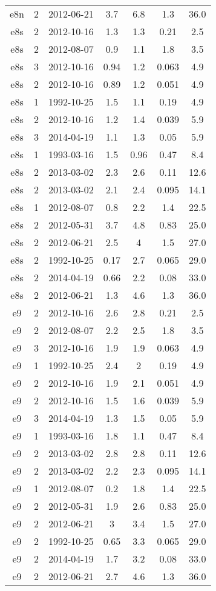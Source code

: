 \begin{table*}[htp]
\begin{tabular}{ccccccc}
e8n & 2 & 2012-06-21 & 3.7 & 6.8 & 1.3 & 36.0 \\
e8s & 2 & 2012-10-16 & 1.3 & 1.3 & 0.21 & 2.5 \\
e8s & 2 & 2012-08-07 & 0.9 & 1.1 & 1.8 & 3.5 \\
e8s & 3 & 2012-10-16 & 0.94 & 1.2 & 0.063 & 4.9 \\
e8s & 2 & 2012-10-16 & 0.89 & 1.2 & 0.051 & 4.9 \\
e8s & 1 & 1992-10-25 & 1.5 & 1.1 & 0.19 & 4.9 \\
e8s & 2 & 2012-10-16 & 1.2 & 1.4 & 0.039 & 5.9 \\
e8s & 3 & 2014-04-19 & 1.1 & 1.3 & 0.05 & 5.9 \\
e8s & 1 & 1993-03-16 & 1.5 & 0.96 & 0.47 & 8.4 \\
e8s & 2 & 2013-03-02 & 2.3 & 2.6 & 0.11 & 12.6 \\
e8s & 2 & 2013-03-02 & 2.1 & 2.4 & 0.095 & 14.1 \\
e8s & 1 & 2012-08-07 & 0.8 & 2.2 & 1.4 & 22.5 \\
e8s & 2 & 2012-05-31 & 3.7 & 4.8 & 0.83 & 25.0 \\
e8s & 2 & 2012-06-21 & 2.5 & 4 & 1.5 & 27.0 \\
e8s & 2 & 1992-10-25 & 0.17 & 2.7 & 0.065 & 29.0 \\
e8s & 2 & 2014-04-19 & 0.66 & 2.2 & 0.08 & 33.0 \\
e8s & 2 & 2012-06-21 & 1.3 & 4.6 & 1.3 & 36.0 \\
e9 & 2 & 2012-10-16 & 2.6 & 2.8 & 0.21 & 2.5 \\
e9 & 2 & 2012-08-07 & 2.2 & 2.5 & 1.8 & 3.5 \\
e9 & 3 & 2012-10-16 & 1.9 & 1.9 & 0.063 & 4.9 \\
e9 & 1 & 1992-10-25 & 2.4 & 2 & 0.19 & 4.9 \\
e9 & 2 & 2012-10-16 & 1.9 & 2.1 & 0.051 & 4.9 \\
e9 & 2 & 2012-10-16 & 1.5 & 1.6 & 0.039 & 5.9 \\
e9 & 3 & 2014-04-19 & 1.3 & 1.5 & 0.05 & 5.9 \\
e9 & 1 & 1993-03-16 & 1.8 & 1.1 & 0.47 & 8.4 \\
e9 & 2 & 2013-03-02 & 2.8 & 2.8 & 0.11 & 12.6 \\
e9 & 2 & 2013-03-02 & 2.2 & 2.3 & 0.095 & 14.1 \\
e9 & 1 & 2012-08-07 & 0.2 & 1.8 & 1.4 & 22.5 \\
e9 & 2 & 2012-05-31 & 1.9 & 2.6 & 0.83 & 25.0 \\
e9 & 2 & 2012-06-21 & 3 & 3.4 & 1.5 & 27.0 \\
e9 & 2 & 1992-10-25 & 0.65 & 3.3 & 0.065 & 29.0 \\
e9 & 2 & 2014-04-19 & 1.7 & 3.2 & 0.08 & 33.0 \\
e9 & 2 & 2012-06-21 & 2.7 & 4.6 & 1.3 & 36.0 \\
\hline
\end{tabular}

\end{table*}
